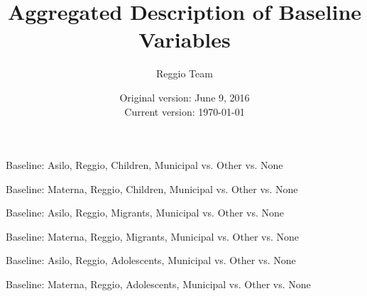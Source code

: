 \documentclass[12pt]{article}
\begin{document}
\title{Aggregated Description of Baseline Variables}
\author{Reggio Team}
\date{Original version: June 9, 2016 \\ Current version: \today}
\maketitle



\begin{table}[htbp]
\begin{center}
	\caption{Baseline: Asilo, Reggio, Children, Municipal vs. Other vs. None}
	
\end{center}
\end{table}

\begin{table}[htbp]
\begin{center}
	\caption{Baseline: Materna, Reggio, Children, Municipal vs. Other vs. None}
	
\end{center}
\end{table}

\begin{table}[htbp]
\begin{center}
	\caption{Baseline: Asilo, Reggio, Migrants, Municipal vs. Other vs. None}
	
\end{center}
\end{table}

\begin{table}[htbp]
\begin{center}
	\caption{Baseline: Materna, Reggio, Migrants, Municipal vs. Other vs. None}
	
\end{center}
\end{table}

\begin{table}[htbp]
\begin{center}
	\caption{Baseline: Asilo, Reggio, Adolescents, Municipal vs. Other vs. None}
	
\end{center}
\end{table}

\begin{table}[htbp]
\begin{center}
	\caption{Baseline: Materna, Reggio, Adolescents, Municipal vs. Other vs. None}
	
\end{center}
\end{table}
\end{document}
